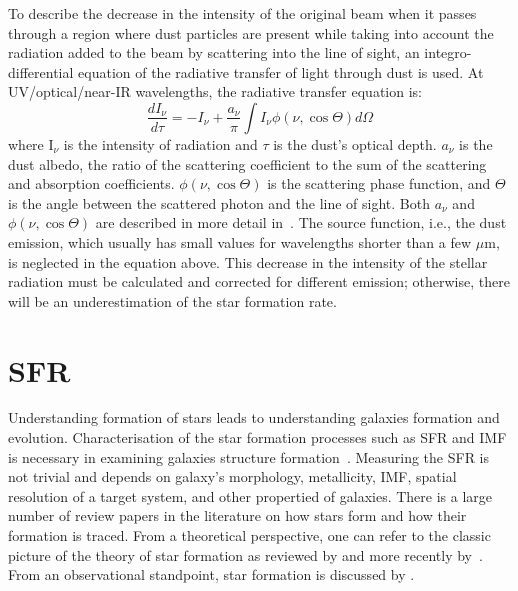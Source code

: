 To describe the decrease in the intensity of the original beam when it passes through a region where dust particles are present while taking into account the radiation added to the beam by scattering into the line of sight, an integro-differential equation of the radiative transfer of light through dust is used. %
At UV/optical/near-IR wavelengths, the radiative transfer equation is: %
\begin{equation}
\frac{dI_{\nu}}{d\tau} = -I_{\nu}  + \frac{a_{\nu}}{\pi} \int I_{\nu}\phi(\nu,\cos \Theta)d\Omega
\end{equation}
where I$_{\nu}$ is the intensity of radiation and $\tau$ is the dust's optical depth.
$a_{\nu}$ is the dust albedo,  the ratio of the scattering coefficient to the sum of the scattering and absorption coefficients. 
$\phi(\nu,\cos \Theta)$ is the scattering phase function, and $\Theta$ is the angle between the scattered photon and the line of sight. %
Both $a_{\nu}$ and $\phi(\nu,\cos \Theta)$ are described in more detail in~\citep{Draine03}. 
The source function, i.e., the dust emission, which usually has small values for wavelengths shorter than a few $\mu$m, is neglected in the equation above. %
This decrease in the intensity of the stellar radiation must be calculated and corrected for different emission; otherwise, there will be an underestimation of the star formation rate. %


\section{SFR}
\label{sec: sfr_intro}
Understanding formation of stars leads to understanding galaxies formation and evolution. 
Characterisation of the star formation processes such as SFR and IMF is necessary in examining galaxies structure formation~\citep{McKee07}. 
Measuring the SFR is not trivial and depends on galaxy's morphology, metallicity, IMF, spatial resolution of a target system, and other propertied of galaxies. 
There is a large number of review papers in the literature on how stars form and how their formation is traced. 
From a theoretical perspective, one can refer to the classic picture of the theory of star formation as reviewed by \cite{Shu87} and more recently by~\citep{McKee07}. 
From an observational standpoint, star formation is discussed by \cite[][and references therein]{Kennicutt98b, Kewley02, Calzetti13, Boquien10, Kennicutt12}.

